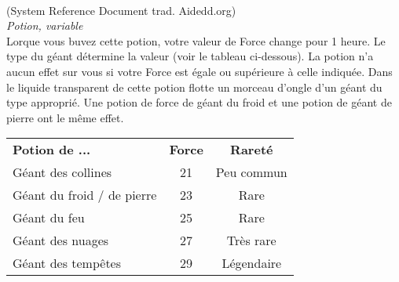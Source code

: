 \\
{\small (System Reference Document trad. Aidedd.org)}\\
{\small \it Potion, variable}\\
Lorque vous buvez cette potion, votre valeur de Force change pour 1 heure. Le type du géant détermine la valeur (voir le tableau ci-dessous). La potion n'a aucun effet sur vous si votre Force est égale ou supérieure à celle indiquée.
Dans le liquide transparent de cette potion flotte un morceau d'ongle d'un géant du type approprié. Une potion de force de géant du froid et une potion de géant de pierre ont le même effet.

\begin{center}
\setlength{\tabcolsep}{4pt}
\begin{tabular}{lcc}
\bf Potion de ...  & \bf Force & \bf Rareté \\
   \rowcolor{LightCyan}
Géant des collines & 21 & Peu commun \\
Géant du froid / de pierre & 23 & Rare \\
   \rowcolor{LightCyan}
Géant du feu & 25 & Rare \\
Géant des nuages & 27 & Très rare \\
   \rowcolor{LightCyan}
Géant des tempêtes & 29 & Légendaire \\
\end{tabular}
\end{center}

